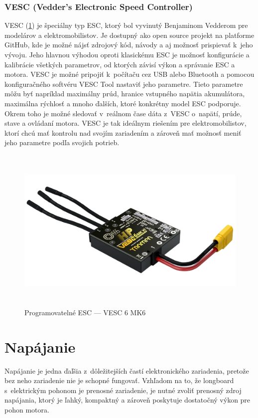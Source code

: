 \subsubsection{VESC (Vedder's Electronic Speed Controller)}
VESC (\ref{fig:vesc}) je špeciálny typ ESC, ktorý bol vyvinutý Benjaminom Vedderom pre modelárov a elektromobilistov.
Je dostupný ako open source projekt na platforme GitHub, kde je možné nájsť zdrojový kód, návody a aj možnosť prispievať k~jeho vývoju.
Jeho hlavnou výhodou oproti klasickému ESC je možnosť konfigurácie a kalibrácie všetkých parametrov, od ktorých závisí výkon a správanie ESC a motora.
VESC je možné pripojiť k~počítaču cez USB alebo Bluetooth a pomocou konfiguračného softvéru VESC Tool nastaviť jeho parametre.
Tieto parametre môžu byť napríklad maximálny prúd, hranice vstupného napätia akumulátora, maximálna rýchlosť a mnoho ďalších, ktoré konkrétny model ESC podporuje.
Okrem toho je možné sledovať v~reálnom čase dáta z~VESC o~napätí, prúde, stave a ovládaní motora.
VESC je tak ideálnym riešením pre elektromobilistov, ktorí chcú mať kontrolu nad svojím zariadením a zároveň mať možnosť meniť jeho parametre podľa svojich potrieb.\cite{VESC}

\begin{figure}[h]
    \centering
    \includegraphics[height=8cm]{obrazky-figures/vesc.png}
    \caption{Programovatelné ESC --- VESC 6 MK6\cite{VESC}}\label{fig:vesc}
\end{figure}

\section{Napájanie}
Napájanie je jedna ďaľšia z~dôležitejších častí elektronického zariadenia, pretože bez neho zariadenie nie je schopné fungovať.
Vzhľadom na to, že longboard s~elektrickým pohonom je prenosné zariadenie, je nutné zvoliť prenosný zdroj napájania, ktorý je ľahký, kompaktný a zároveň poskytuje dostatočný výkon pre pohon motora.

